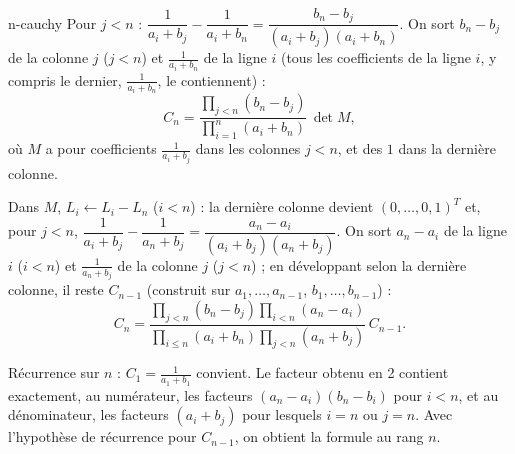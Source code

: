 \begin{corrige}{n-cauchy}
 Pour $j<n$ : $\dfrac1{a_i+b_j}-\dfrac1{a_i+b_n}=\dfrac{b_n-b_j}{(a_i+b_j)(a_i+b_n)}$. On sort $b_n-b_j$ de la colonne $j$ ($j<n$) et $\frac1{a_i+b_n}$ de la ligne $i$ (tous les coefficients de la ligne $i$, y compris le dernier, $\frac1{a_i+b_n}$, le contiennent) :
\[C_n=\frac{\prod_{j<n}(b_n-b_j)}{\prod_{i=1}^n(a_i+b_n)}\,\det M,\]
où $M$ a pour coefficients $\frac1{a_i+b_j}$ dans les colonnes $j<n$, et des $1$ dans la dernière colonne.

 Dans $M$, $L_i\leftarrow L_i-L_n$ ($i<n$) : la dernière colonne devient $(0,\dots,0,1)^T$ et, pour $j<n$, $\dfrac1{a_i+b_j}-\dfrac1{a_n+b_j}=\dfrac{a_n-a_i}{(a_i+b_j)(a_n+b_j)}$. On sort $a_n-a_i$ de la ligne $i$ ($i<n$) et $\frac1{a_n+b_j}$ de la colonne $j$ ($j<n$) ; en développant selon la dernière colonne, il reste $C_{n-1}$ (construit sur $a_1,\dots,a_{n-1}$, $b_1,\dots,b_{n-1}$) :
\[C_n=\frac{\prod_{j<n}(b_n-b_j)\prod_{i<n}(a_n-a_i)}{\prod_{i\leq n}(a_i+b_n)\prod_{j<n}(a_n+b_j)}\,C_{n-1}.\]

 Récurrence sur $n$ : $C_1=\frac1{a_1+b_1}$ convient. Le facteur obtenu en 2 contient exactement, au numérateur, les facteurs $(a_n-a_i)(b_n-b_i)$ pour $i<n$, et au dénominateur, les facteurs $(a_i+b_j)$ pour lesquels $i=n$ ou $j=n$. Avec l'hypothèse de récurrence pour $C_{n-1}$, on obtient la formule au rang $n$.
\end{corrige}
